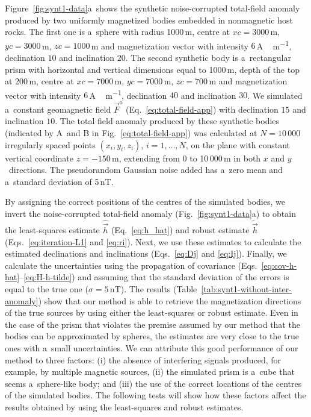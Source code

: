 \documentclass[journal abbreviation, npg]{copernicus}
\begin{document}
Figure~\ref{fig:synt1-data}a~shows the synthetic noise-corrupted total-field
anomaly produced by two uniformly magnetized bodies embedded in nonmagnetic
host rocks. The first one is a~sphere with radius 1000\,\unit{m}, centre at
$xc = 3000$\,\unit{m}, $yc = 3000$\,\unit{m}, $zc = 1000$\,\unit{m} and
magnetization vector with intensity $6$\,\unit{A\,m^{-1}}, declination
$10${\degree} and inclination $20${\degree}. The second synthetic body is
a~rectangular prism with horizontal and vertical dimensions equal to
1000\,\unit{m}, depth of the top at 200\,\unit{m}, centre at $xc =
7000$\,\unit{m}, $yc = 7000$\,\unit{m}, $zc = 700$\,\unit{m} and
magnetization vector with intensity $6$\,\unit{A\,m^{-1}}, declination
$40${\degree} and inclination $30${\degree}. We simulated a~constant
geomagnetic field $\vec{F}^\mathrm{o}$ (Eq.~\ref{eq:total-field-app}) with
declination $15${\degree} and inclination $10${\degree}. The total field
anomaly produced by these synthetic bodies (indicated by A~and B in
Fig.~\ref{eq:total-field-app}) was calculated at $N = 10\,000$ irregularly
spaced points $(x_{i}, y_{i}, z_{i})$, $i = 1, \ldots, N$, on the plane with
constant vertical coordinate $z=-150$\,\unit{m}, extending from 0 to
10\,000\,\unit{m} in both $x$ and $y$~directions. The pseudorandom Gaussian
noise added has a~zero mean and a~standard deviation of 5\,nT.

By assigning the correct positions of the centres of the simulated bodies, we
invert the noise-corrupted total-field anomaly (Fig.~\ref{fig:synt1-data}a)
to obtain the least-squares estimate $\hat{\vec{h}}$ (Eq.~\ref{eq:h_hat}) and
robust estimate $\tilde{\vec{h}}$ (Eqs.~\ref{eq:iteration-L1} and
\ref{eq:ri}). Next, we use these estimates to calculate the estimated
declinations and inclinations (Eqs.~\ref{eq:Dj} and \ref{eq:Ij}). Finally, we
calculate the uncertainties using the propagation of covariance
(Eqs.~\ref{eq:cov-h-hat}--\ref{eq:H-h-tilde}) and assuming that the standard
deviation of the errors is equal to the true one ($\sigma = 5$\,nT). The
results (Table~\ref{tab:synt1-without-inter-anomaly}) show that our method is
able to retrieve the magnetization directions of the true sources by using
either the least-squares or robust estimate. Even in the case of the prism
that violates the premise assumed by our method that the bodies can be
approximated by spheres, the estimates are very close to the true ones with
a~small uncertainties. We can attribute this good performance of our method
to three factors: (i) the absence of interfering signals produced, for
example, by multiple magnetic sources, (ii) the simulated prism is a~cube
that seems a~sphere-like body; and (iii) the use of the correct locations of
the centres of the simulated bodies. The following tests will show how these
factors affect the results obtained by using the least-squares and robust
estimates.
\end{document}

